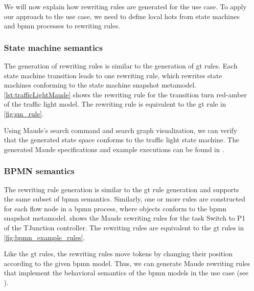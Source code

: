 \documentclass{jot}
\begin{document}
We will now explain how rewriting rules are generated for the use case.
To apply our approach to the use case, we need to define local \gls*{hot}s from state machines and \gls*{bpmn} processes to rewriting rules.


\subsubsection{State machine semantics}
The generation of rewriting rules is similar to the generation of \gls*{gt} rules.
Each state machine transition leads to one rewriting rule, which rewrites state machines conforming to the state machine snapshot metamodel.
\autoref{lst:trafficLightMaude} shows the rewriting rule for the transition \textsf{turn red-amber} of the traffic light model.
The rewriting rule is equivalent to the \gls*{gt} rule in \cref{fig:sm_rule}.



Using Maude's search command and search graph visualization, we can verify that the generated state space conforms to the traffic light state machine.
The generated Maude specifications and example executions can be found in \cite{krauterArtifactsBehavioralConsistency2022}.

\subsubsection{BPMN semantics}
The rewriting rule generation is similar to the \gls*{gt} rule generation and supports the same subset of \gls*{bpmn} semantics.
Similarly, one or more rules are constructed for each flow node in a \gls*{bpmn} process, where objects conform to the \gls*{bpmn} snapshot metamodel.
 shows the Maude rewriting rules for the task \textsf{Switch to P1} of the TJunction controller.
The rewriting rules are equivalent to the \gls*{gt} rules in \cref{fig:bpmn_example_rules}.



Like the \gls*{gt} rules, the rewriting rules move tokens by changing their position according to the given \gls*{bpmn} model.
Thus, we can generate Maude rewriting rules that implement the behavioral semantics of the \gls*{bpmn} models in the use case (see \cite{krauterArtifactsBehavioralConsistency2022}).
\end{document}
